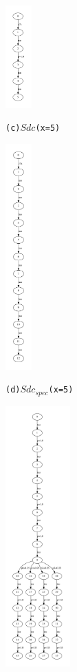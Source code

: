 \documentclass[a4paper,UKenglish,cleveref, autoref]{lipics-v2019}
\begin{document}
\begin{figure} [htbp]
\begin{minipage}{0.1\linewidth}
  \centerline{\includegraphics[width=1.0cm]{images/Sdc-2.pdf}}
  \centerline{\texttt{(c)$Sdc$(x=5)}}
\end{minipage}
\hfill
\begin{minipage}{0.1\linewidth}
  \centerline{\includegraphics[width=1.0cm]{images/Sdc-spec-2.pdf}}
  \centerline{\texttt{(d)$Sdc_{spec}$(x=5)}}
\end{minipage}
\hfill
\begin{minipage}{0.2\linewidth}
  \centerline{\includegraphics[width=2.5cm]{images/Tele.pdf}}

\end{minipage}
\end{figure}
\end{document}
